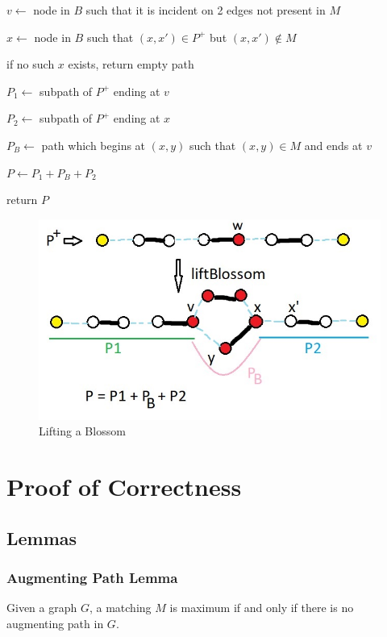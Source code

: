 \documentclass{article}
\begin{document}
\hspace{1cm} $v \leftarrow$ node in $B$ such that it is incident on 2 edges not present in $M$

\hspace{1cm} $x \leftarrow$ node in $B$ such that $(x, x') \in P^+$ but $(x, x') \notin M$

\hspace{1cm} if no such $x$ exists, return empty path

\hspace{1cm} $P_1 \leftarrow$ subpath of $P^+$ ending at $v$

\hspace{1cm} $P_2 \leftarrow$ subpath of $P^+$ ending at $x$

\hspace{1cm} $P_B \leftarrow$ path which begins at $(x, y)$ such that $(x, y) \in M$ and ends at $v$

\hspace{1cm} $P \leftarrow P_1 + P_B + P_2$

\hspace{1cm} return $P$

\begin{figure}[!h]
    \centering
    \includegraphics[scale=0.75]{lifting.jpg}
    \caption{Lifting a Blossom}
\end{figure}


\section{Proof of Correctness}
\subsection{Lemmas}
\subsubsection{Augmenting Path Lemma}
Given a graph $G$, a matching $M$ is maximum if and only if there is no augmenting path in $G$.
\end{document}
